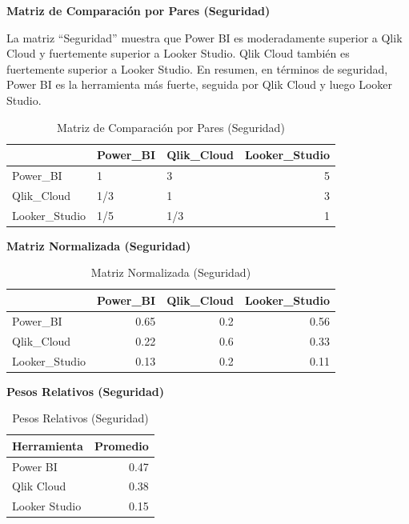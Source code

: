 \documentclass[
  11pt,
  bookmarksnumbered]{article}
\begin{document}
\textbf{Matriz de Comparación por Pares (Seguridad)}

La matriz ``Seguridad'' muestra que Power BI es moderadamente superior a Qlik Cloud y fuertemente superior a Looker Studio. Qlik Cloud también es fuertemente superior a Looker Studio. En resumen, en términos de seguridad, Power BI es la herramienta más fuerte, seguida por Qlik Cloud y luego Looker Studio.

\begin{table}[H]

\caption{\label{tab:unnamed-chunk-36}Matriz de Comparación por Pares (Seguridad)}
\centering
\fontsize{12}{14}\selectfont
\begin{tabular}[t]{l|l|l|r}
\hline
  & Power\_BI & Qlik\_Cloud & Looker\_Studio\\
\hline
Power\_BI & 1 & 3 & 5\\
\hline
Qlik\_Cloud & 1/3 & 1 & 3\\
\hline
Looker\_Studio & 1/5 & 1/3 & 1\\
\hline
\end{tabular}
\end{table}

\newpage

\textbf{Matriz Normalizada (Seguridad)}

\begin{table}[H]

\caption{\label{tab:unnamed-chunk-37}Matriz Normalizada (Seguridad)}
\centering
\fontsize{12}{14}\selectfont
\begin{tabular}[t]{l|r|r|r}
\hline
  & Power\_BI & Qlik\_Cloud & Looker\_Studio\\
\hline
Power\_BI & 0.65 & 0.2 & 0.56\\
\hline
Qlik\_Cloud & 0.22 & 0.6 & 0.33\\
\hline
Looker\_Studio & 0.13 & 0.2 & 0.11\\
\hline
\end{tabular}
\end{table}

\textbf{Pesos Relativos (Seguridad)}

\begin{table}[H]

\caption{\label{tab:unnamed-chunk-38}Pesos Relativos (Seguridad)}
\centering
\fontsize{12}{14}\selectfont
\begin{tabular}[t]{l|r}
\hline
Herramienta & Promedio\\
\hline
Power BI & 0.47\\
\hline
Qlik Cloud & 0.38\\
\hline
Looker Studio & 0.15\\
\hline
\end{tabular}
\end{table}
\end{document}
